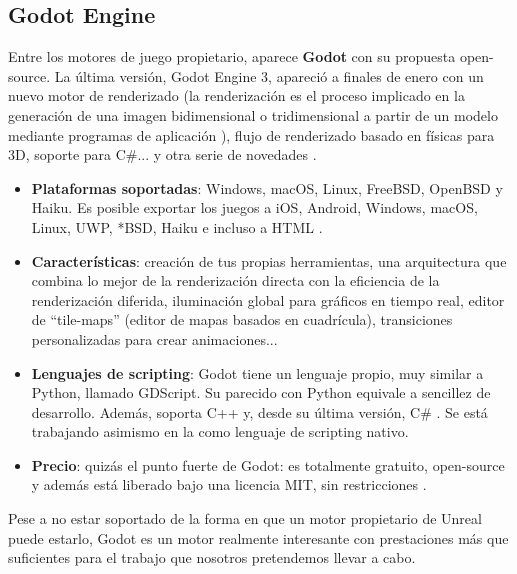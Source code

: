 \subsection{Godot Engine}
Entre los motores de juego propietario, aparece \textbf{Godot} con su propuesta open-source. La última versión, Godot Engine 3, apareció a finales de enero con un nuevo motor de renderizado (la renderización es el proceso implicado en la generación de una imagen bidimensional o tridimensional a partir de un modelo mediante programas de aplicación \cite{wiki:render}), flujo de renderizado basado en físicas para 3D, soporte para C\#... y otra serie de novedades \cite{newgodot}.
\begin{itemize}
\item \textbf{Plataformas soportadas}: Windows, macOS, Linux, FreeBSD, OpenBSD y Haiku. Es posible exportar los juegos a iOS, Android, Windows, macOS, Linux, UWP, *BSD, Haiku e incluso a HTML \cite{godotfeatures}.
\item \textbf{Características}: creación de tus propias herramientas, una arquitectura que combina lo mejor de la renderización directa con la eficiencia de la renderización diferida, iluminación global para gráficos en tiempo real, editor de ``tile-maps'' (editor de mapas basados en cuadrícula), transiciones personalizadas para crear animaciones...\cite{godotfeatures}
\item \textbf{Lenguajes de scripting}: Godot tiene un lenguaje propio, muy similar a Python, llamado GDScript. Su parecido con Python equivale a sencillez de desarrollo. Además, soporta C++ y, desde su última versión, C\# \cite{godotfeatures}. Se está trabajando asimismo en la  como lenguaje de scripting nativo.
\item \textbf{Precio}: quizás el punto fuerte de Godot: es totalmente gratuito, open-source y además está liberado bajo una licencia MIT, sin restricciones \cite{godotfree}.
\end{itemize}

Pese a no estar soportado de la forma en que un motor propietario de Unreal puede estarlo, Godot es un motor realmente interesante con prestaciones más que suficientes para el trabajo que nosotros pretendemos llevar a cabo.

